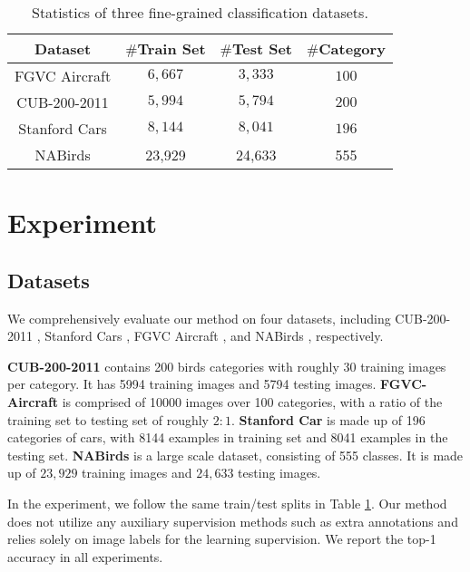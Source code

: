 \documentclass[journal]{IEEEtran}
\begin{document}
\setlength{\tabcolsep}{4pt}
\begin{table}[t]
\caption{Statistics of three fine-grained
classification datasets.}
\small
    \begin{center}
    \begin{tabular}{|c|c|c|c|}
    \hline
    Dataset & $\#$Train Set & $\#$Test Set& $\#$Category  \\
    \hline
    \hline
    FGVC Aircraft \cite{maji2013fine} & $6,667$ & $3,333$ & $100$ \\
    \hline
    CUB-200-2011 \cite{wah2011caltech} & $5,994$ & $5,794$ & $200$ \\
    \hline
    Stanford Cars \cite{krause20133d}  & $8,144$ & $8,041$ & $196$ \\
    \hline
    NABirds \cite{van2015building} & 23,929 & 24,633 & 555 \\
    \hline
    \end{tabular}
    \end{center}
\label{data_stat}
\end{table}
\section{Experiment}
\subsection{Datasets}
We comprehensively evaluate our method on four datasets, including CUB-200-2011 \cite{wah2011caltech}, Stanford Cars \cite{krause20133d}, FGVC Aircraft \cite{maji2013fine}, and NABirds \cite{van2015building}, respectively. 


\textbf{CUB-200-2011} contains 200 birds categories
with roughly 30 training images per category. It has 5994 training images and 5794 testing images.
\textbf{FGVC-Aircraft} is comprised of 10000 images over 100 categories, with a ratio of the training set to testing set of roughly $2:1$. 
\textbf{Stanford Car} is made up of 196 categories of cars, with 8144 examples in training set and 8041 examples in the testing set.
\textbf{NABirds} is a large scale dataset, consisting of 555 classes. It is made up of $23,929$ training images and $24,633$ testing images.

In the experiment, we follow the same train/test splits in Table \ref{data_stat}. Our method does not utilize any auxiliary supervision methods such as extra annotations and relies solely on image labels for the learning supervision. We report the top-1 accuracy in all experiments.
\end{document}
